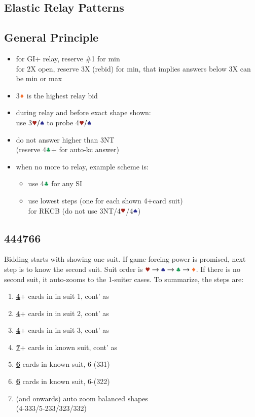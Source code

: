 \documentclass{article}
\begin{document}
\begin{multicols}{2}
\section{Elastic Relay Patterns}

\subsection{General Principle}
\begin{itemize}
    \item for GI+ relay, reserve \#1 for min \\
        for 2X open, reserve 3X (rebid) for min,
        that implies answers below 3X can be min or max
    \item 3$\ddd$ is the highest relay bid
    \item during relay and before exact shape shown: \\
        use 3$\hhh/\sss$ to probe 4$\hhh/\sss$
    \item do not answer higher than 3NT \\
        (reserve 4$\ccc$+ for auto-kc answer)
    \item when no more to relay, example scheme is:
    \begin{itemize}
        \item use 4$\ccc$ for any SI
        \item use lowest steps (one for each shown 4+card suit) \\
            for RKCB (do not use 3NT/4$\hhh$/4$\sss$)
    \end{itemize}
\end{itemize}

\subsection{444766}\label{sec:444766}
Bidding starts with showing one suit. If game-forcing power is promised, next step is to know the second suit.
Suit order is $\hscd$. If there is no second suit, it auto-zooms to the 1-suiter cases. To summarize, the steps are:

\begin{enumerate}
    \item \textbf{\underline{4}}+ cards in in suit 1, cont' as 
    \item \textbf{\underline{4}}+ cards in in suit 2, cont' as
    \item \textbf{\underline{4}}+ cards in in suit 3, cont' as
    \item \textbf{\underline{7}}+ cards in known suit, cont' as
    \item \textbf{\underline{6}} cards in known suit, 6-(331)
    \item \textbf{\underline{6}} cards in known suit, 6-(322)
    \item (and onwards) auto zoom balanced shapes \\
        (4-333/5-233/323/332)
\end{enumerate}


\end{multicols}
\end{document}
